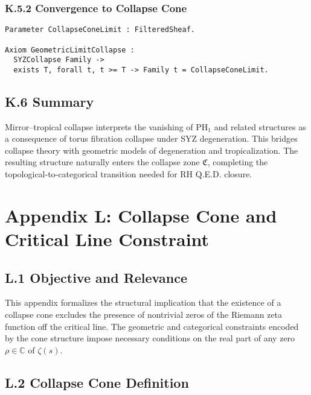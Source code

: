 \documentclass[11pt]{article}
\begin{document}
\subsubsection*{K.5.2 Convergence to Collapse Cone}

\begin{lstlisting}[language=Coq, caption=Collapse Zone Limit from Tropical Degeneration, captionpos=b]
Parameter CollapseConeLimit : FilteredSheaf.

Axiom GeometricLimitCollapse :
  SYZCollapse Family ->
  exists T, forall t, t >= T -> Family t = CollapseConeLimit.
\end{lstlisting}

\subsection*{K.6 Summary}

Mirror–tropical collapse interprets the vanishing of \( \mathrm{PH}_1 \) and related structures as a consequence of torus fibration collapse under SYZ degeneration. This bridges collapse theory with geometric models of degeneration and tropicalization. The resulting structure naturally enters the collapse zone \( \mathfrak{C} \), completing the topological-to-categorical transition needed for RH Q.E.D. closure.




\appendix
\section*{Appendix L: Collapse Cone and Critical Line Constraint}

\subsection*{L.1 Objective and Relevance}

This appendix formalizes the structural implication that the existence of a collapse cone excludes the presence of nontrivial zeros of the Riemann zeta function off the critical line. The geometric and categorical constraints encoded by the cone structure impose necessary conditions on the real part of any zero \( \rho \in \mathbb{C} \) of \( \zeta(s) \).

\subsection*{L.2 Collapse Cone Definition}
\end{document}
